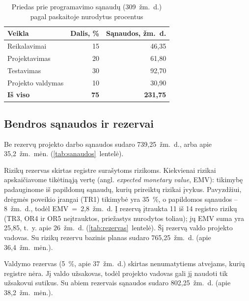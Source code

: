\begin{table}[H]
  \centering
  \caption{Priedas prie programavimo sąnaudų (309~žm.~d.) pagal paskaitoje nurodytus procentus}
  \label{tab:priedas}
  \small
  \begin{tabular}{@{}lrr@{}}
    \toprule
    \textbf{Veikla} & \textbf{Dalis, \%} & \textbf{Sąnaudos, žm.~d.} \\
    \midrule
    Reikalavimai & 15 & 46,35 \\
    Projektavimas & 20 & 61,80 \\
    Testavimas & 30 & 92,70 \\
    Projekto valdymas & 10 & 30,90 \\
    \midrule
    \textbf{Iš viso} & \textbf{75} & \textbf{231,75} \\
    \bottomrule
  \end{tabular}
\end{table}

\subsection{Bendros sąnaudos ir rezervai}

Be rezervų projekto darbo sąnaudos sudaro 739,25~žm.~d., arba apie
35,2~žm.~mėn. (\ref{tab:sanaudos}~lentelė).

Rizikų rezervas skirtas registre surašytoms rizikoms. Kiekvienai rizikai
apskaičiavome tikėtinąją vertę (angl. \textit{expected monetary value},
EMV): tikimybę padauginome iš papildomų sąnaudų, kurių prireiktų rizikai
įvykus. Pavyzdžiui, drėgmės poveikio įrangai (TR1) tikimybė yra 35~\%, o
papildomos sąnaudos – 8~žm.~d., todėl EMV~=~2,8~žm.~d. Į rezervą įtraukta 11 iš 14 registro
rizikų (TR3, OR4 ir OR5 neįtrauktos, priežastys nurodytos toliau); jų EMV
suma yra 25,85, t.~y. apie 26~žm.~d. (\ref{tab:rezervas}~lentelė). Šį
rezervą valdo projekto vadovas. Su rizikų rezervu bazinis planas sudaro
765,25~žm.~d. (apie 36,4~žm.~mėn.).

Valdymo rezervas (5~\%, apie 37~žm.~d.) skirtas nenumatytiems atvejams,
kurių registre nėra. Jį valdo užsakovas, todėl projekto vadovas gali jį
naudoti tik užsakovui sutikus. Su abiem rezervais sąnaudos sudaro
802,25~žm.~d. (apie 38,2~žm.~mėn.).

